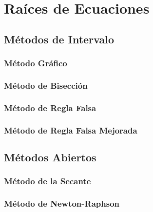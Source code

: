 \chapter{Raíces de Ecuaciones}
\section{Métodos de Intervalo}
\subsection{Método Gráfico}
\subsection{Método de Bisección}
\subsection{Método de Regla Falsa}
\subsection{Método de Regla Falsa Mejorada}
\section{Métodos Abiertos}
\subsection{Método de la Secante}
\subsection{Método de Newton-Raphson}